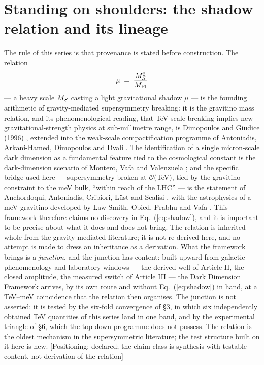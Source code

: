 \section{Standing on shoulders: the shadow relation and its lineage}
The rule of this series is that provenance is stated before construction. The relation
\begin{equation}
\mu\;=\;\frac{M_S^{2}}{M_{\rm Pl}}
\label{eq:shadow}
\end{equation}
--- a heavy scale $M_S$ casting a light gravitational shadow $\mu$ --- is the founding arithmetic of gravity-mediated supersymmetry breaking: it is the gravitino mass relation, and its phenomenological reading, that TeV-scale breaking implies new gravitational-strength physics at sub-millimetre range, is Dimopoulos and Giudice (1996) \cite{DG96}, extended into the weak-scale compactification programme of Antoniadis, Arkani-Hamed, Dimopoulos and Dvali \cite{ADD98}. The identification of a single micron-scale dark dimension as a fundamental feature tied to the cosmological constant is the dark-dimension scenario of Montero, Vafa and Valenzuela \cite{MVV}; and the specific bridge used here --- supersymmetry broken at $\mathcal{O}$(TeV), tied by the gravitino constraint to the meV bulk, ``within reach of the LHC'' --- is the statement of Anchordoqui, Antoniadis, Cribiori, L\"ust and Scalisi \cite{AAL}, with the astrophysics of a meV gravitino developed by Law-Smith, Obied, Prabhu and Vafa \cite{CPV}. This framework therefore claims no discovery in Eq.~(\ref{eq:shadow}), and it is important to be precise about what it does and does not bring. The relation is inherited whole from the gravity-mediated literature; it is not re-derived here, and no attempt is made to dress an inheritance as a derivation. What the framework brings is a \emph{junction}, and the junction has content: built upward from galactic phenomenology and laboratory windows --- the derived well of Article II, the closed amplitude, the measured switch of Article III --- the Dark Dimension Framework arrives, by its own route and without Eq.~(\ref{eq:shadow}) in hand, at a TeV--meV coincidence that the relation then organises. The junction is not asserted: it is tested by the six-fold convergence of \S3, in which six independently obtained TeV quantities of this series land in one band, and by the experimental triangle of \S6, which the top-down programme does not possess. The relation is the oldest mechanism in the supersymmetric literature; the test structure built on it here is new. [Positioning: declared; the claim class is synthesis with testable content, not derivation of the relation]

